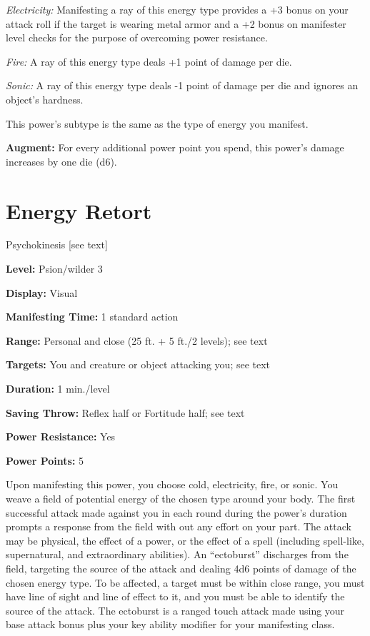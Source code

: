 \documentclass{article}
\begin{document}
\textit{Electricity: }Manifesting a ray of this energy type provides a +3 bonus 
on your attack roll if the target is wearing metal armor and a +2 bonus on manifester 
level checks for the purpose of overcoming power resistance.

\textit{Fire: }A ray of this energy type deals +1 point of damage per die.

\textit{Sonic: }A ray of this energy type deals -1 point of damage per die and 
ignores an object's hardness.

This power's subtype is the same as the type of energy you manifest. 

\textbf{Augment:} For every additional power point you spend, this power's damage 
increases by one die (d6).

\vspace{12pt}
\section*{Energy Retort}

Psychokinesis [see text]

\textbf{Level:} Psion/wilder 3

\textbf{Display:} Visual

\textbf{Manifesting Time:} 1 standard action

\textbf{Range:} Personal and close (25 ft. + 5 ft./2 levels); see text

\textbf{Targets:} You and creature or object attacking you; see text

\textbf{Duration:} 1 min./level

\textbf{Saving Throw:} Reflex half or Fortitude half; see text

\textbf{Power Resistance:} Yes

\textbf{Power Points:} 5

Upon manifesting this power, you choose cold, electricity, fire, or sonic. You 
weave a field of potential energy of the chosen type around your body. The first 
successful attack made against you in each round during the power's duration prompts 
a response from the field with out any effort on your part. The attack may be physical, 
the effect of a power, or the effect of a spell (including spell-like, supernatural, 
and extraordinary abilities). An ``ectoburst'' discharges from the field, targeting 
the source of the attack and dealing 4d6 points of damage of the chosen energy 
type. To be affected, a target must be within close range, you must have line of 
sight and line of effect to it, and you must be able to identify the source of 
the attack. The ectoburst is a ranged touch attack made using your base attack 
bonus plus your key ability modifier for your manifesting class.
\end{document}
